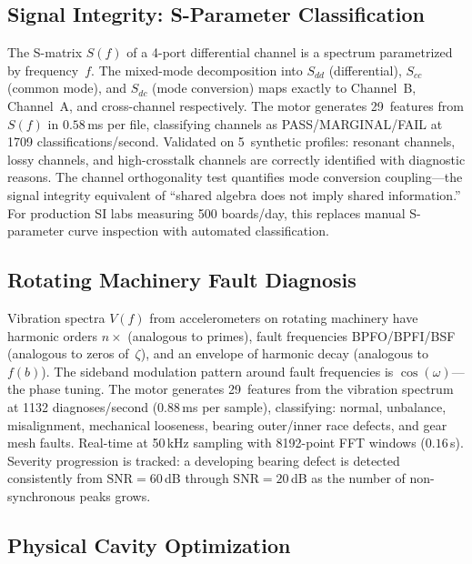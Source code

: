 \documentclass[11pt]{amsart}
\begin{document}
\subsection{Signal Integrity: S-Parameter Classification}

The S-matrix $S(f)$ of a 4-port differential channel is a spectrum
parametrized by frequency~$f$. The mixed-mode decomposition into $S_{dd}$
(differential), $S_{cc}$ (common mode), and $S_{dc}$ (mode conversion) maps
exactly to Channel~B, Channel~A, and cross-channel respectively. The motor
generates 29~features from $S(f)$ in $0.58\,$ms per file, classifying
channels as PASS/MARGINAL/FAIL at 1709 classifications/second. Validated on
5~synthetic profiles: resonant channels, lossy channels, and high-crosstalk
channels are correctly identified with diagnostic reasons. The channel
orthogonality test quantifies mode conversion coupling---the signal integrity
equivalent of ``shared algebra does not imply shared information.'' For
production SI labs measuring 500 boards/day, this replaces manual
S-parameter curve inspection with automated classification.

\subsection{Rotating Machinery Fault Diagnosis}

Vibration spectra $V(f)$ from accelerometers on rotating machinery have
harmonic orders $n\times$ (analogous to primes), fault frequencies
BPFO/BPFI/BSF (analogous to zeros of~$\zeta$), and an envelope of harmonic
decay (analogous to $f(b)$). The sideband modulation pattern around fault
frequencies is $\cos(\omega)$---the phase tuning. The motor generates
29~features from the vibration spectrum at 1132 diagnoses/second ($0.88\,$ms
per sample), classifying: normal, unbalance, misalignment, mechanical
looseness, bearing outer/inner race defects, and gear mesh faults. Real-time
at 50\,kHz sampling with 8192-point FFT windows ($0.16\,$s). Severity
progression is tracked: a developing bearing defect is detected consistently
from $\text{SNR}=60\,$dB through $\text{SNR}=20\,$dB as the number of
non-synchronous peaks grows.

\subsection{Physical Cavity Optimization}
\end{document}
